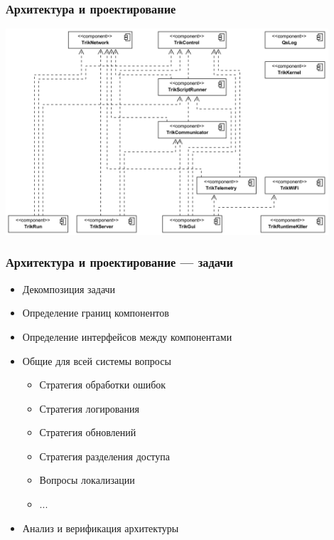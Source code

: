 \documentclass[xetex,mathserif,serif]{beamer}
\begin{document}
	\begin{frame}
		\frametitle{Архитектура и проектирование}
		\begin{center}
			\includegraphics[width=0.9\textwidth]{trikRuntimeComponents.png}
		\end{center}
	\end{frame}

	\begin{frame}
		\frametitle{Архитектура и проектирование --- задачи}
		\begin{itemize}
			\item Декомпозиция задачи
			\item Определение границ компонентов
			\item Определение интерфейсов между компонентами
			\item Общие для всей системы вопросы
			\begin{itemize}
				\item Стратегия обработки ошибок
				\item Стратегия логирования
				\item Стратегия обновлений
				\item Стратегия разделения доступа
				\item Вопросы локализации
				\item ...
			\end{itemize}
			\item Анализ и верификация архитектуры
		\end{itemize}
	\end{frame}
\end{document}
